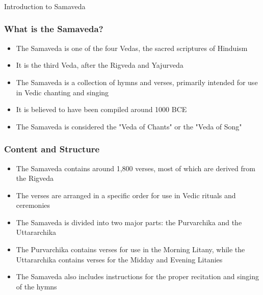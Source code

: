 \begin{frame}[fragile]\frametitle{}
\begin{center}
{\Large Introduction to Samaveda}
\end{center}
\end{frame}

\begin{frame}[fragile]\frametitle{What is the Samaveda?}
    \begin{itemize}
        \item The Samaveda is one of the four Vedas, the sacred scriptures of Hinduism
        \item It is the third Veda, after the Rigveda and Yajurveda
        \item The Samaveda is a collection of hymns and verses, primarily intended for use in Vedic chanting and singing
        \item It is believed to have been compiled around 1000 BCE
        \item The Samaveda is considered the "Veda of Chants" or the "Veda of Song"
    \end{itemize}
\end{frame}

\begin{frame}[fragile]\frametitle{Content and Structure}
    \begin{itemize}
        \item The Samaveda contains around 1,800 verses, most of which are derived from the Rigveda
        \item The verses are arranged in a specific order for use in Vedic rituals and ceremonies
        \item The Samaveda is divided into two major parts: the Purvarchika and the Uttararchika
        \item The Purvarchika contains verses for use in the Morning Litany, while the Uttararchika contains verses for the Midday and Evening Litanies
        \item The Samaveda also includes instructions for the proper recitation and singing of the hymns
    \end{itemize}
\end{frame}

